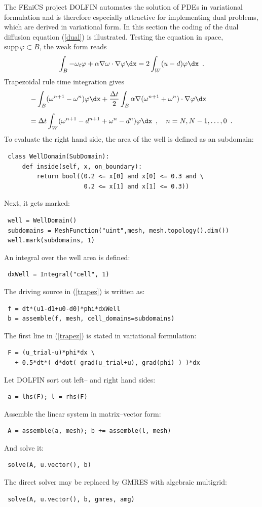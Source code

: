 The FEniCS project DOLFIN \cite{DOLFIN} automates the solution of PDEs in variational formulation
and is therefore especially attractive for implementing dual problems,
which are derived in variational form.
In this section the coding of the dual diffusion equation
(\ref{dual}) is illustrated.
Testing the equation in space, $\mathrm{supp}\, \varphi \subset B$,
the weak form reads 
$$
 \int_B -\omega_t \varphi + \alpha \nabla \omega \cdot \nabla \varphi \dx =
 2 \int_W (u-d) \varphi \dx \enspace .
$$
Trapezoidal rule time integration gives
\begin{equation} \label{trapez}
 \begin{array}{l}
 \displaystyle - \int_B (\omega^{n+1}-\omega^n) \varphi \dx 
     + \frac{\Delta t}{2} \int_B \alpha \nabla(\omega^{n+1}+\omega^n) \cdot \nabla \varphi \dx \\[5mm]
 \displaystyle = \Delta t \int_W (\omega^{n+1} - d^{n+1} +\omega^n -d^n) \varphi \dx
 \enspace , \quad n = N, N-1,\ldots, 0 \enspace .
 \end{array}
\end{equation}
To evaluate the right hand side, the area of the well is defined as an subdomain:
\begin{verbatim}
 class WellDomain(SubDomain):
     def inside(self, x, on_boundary):
         return bool((0.2 <= x[0] and x[0] <= 0.3 and \
                      0.2 <= x[1] and x[1] <= 0.3))
\end{verbatim}
Next, it gets marked:
\begin{verbatim}
 well = WellDomain()
 subdomains = MeshFunction("uint",mesh, mesh.topology().dim())
 well.mark(subdomains, 1)
\end{verbatim}
An integral over the well area is defined:
\begin{verbatim}
 dxWell = Integral("cell", 1)
\end{verbatim}
The driving source in (\ref{trapez}) is written as:
\begin{verbatim}
 f = dt*(u1-d1+u0-d0)*phi*dxWell
 b = assemble(f, mesh, cell_domains=subdomains)
\end{verbatim}
The first line in (\ref{trapez}) is stated in variational formulation:
\begin{verbatim}
 F = (u_trial-u)*phi*dx \
   + 0.5*dt*( d*dot( grad(u_trial+u), grad(phi) ) )*dx
\end{verbatim}
Let DOLFIN sort out left-- and right hand sides:
\begin{verbatim}
 a = lhs(F); l = rhs(F)
\end{verbatim}
Assemble the linear system in matrix--vector form:
\begin{verbatim}
 A = assemble(a, mesh); b += assemble(l, mesh)
\end{verbatim}
And solve it:
\begin{verbatim}
 solve(A, u.vector(), b)
\end{verbatim}
The direct solver may be replaced by GMRES with algebraic multigrid:
\begin{verbatim}
 solve(A, u.vector(), b, gmres, amg)
\end{verbatim}

